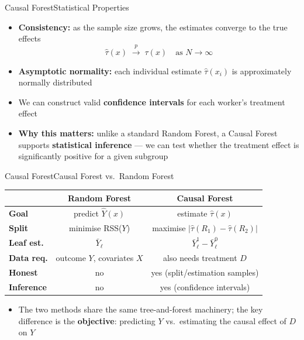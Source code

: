 \documentclass[dvipsnames,hyperref={pdfpagelabels=false}]{beamer}
\begin{document}
\begin{frame}{Causal Forest}{Statistical Properties}
\begin{itemize}
	\item \textbf{Consistency:} as the sample size grows, the estimates converge to the true effects
	\[
		\hat{\tau}(x) \;\xrightarrow{\;p\;}\; \tau(x) \quad \text{as } N \to \infty
	\]
	\vspace{0.1cm}
	\item \textbf{Asymptotic normality:} each individual estimate $\hat{\tau}(x_i)$ is approximately normally distributed
	\vspace{0.3cm}
	\item[$\Rightarrow$] We can construct valid \textbf{confidence intervals} for each worker's treatment effect
	\vspace{0.3cm}
	\item \textbf{Why this matters:} unlike a standard Random Forest, a Causal Forest supports \textbf{statistical inference} --- we can test whether the treatment effect is significantly positive for a given subgroup
\end{itemize}
\end{frame}




\begin{frame}{Causal Forest}{Causal Forest vs.\ Random Forest}
\begin{center}
\begin{tabular}{lcc}
	\hline
	& \textbf{Random Forest} & \textbf{Causal Forest} \\
	\hline
	\textbf{Goal}      & predict $\hat{Y}(x)$  & estimate $\hat{\tau}(x)$ \\[4pt]
	\textbf{Split}     & minimise RSS($Y$)     & maximise $|\hat{\tau}(R_1) - \hat{\tau}(R_2)|$ \\[4pt]
	\textbf{Leaf est.} & $\bar{Y}_\ell$        & $\bar{Y}^1_\ell - \bar{Y}^0_\ell$ \\[4pt]
	\textbf{Data req.} & outcome $Y$, covariates $X$ & also needs treatment $D$ \\[4pt]
	\textbf{Honest}    & no                    & yes (split/estimation samples) \\[4pt]
	\textbf{Inference} & no                    & yes (confidence intervals) \\
	\hline
\end{tabular}
\end{center}
\vspace{0.3cm}
\begin{itemize}
	\item The two methods share the same tree-and-forest machinery; the key difference is the \textbf{objective}: predicting $Y$ vs.\ estimating the causal effect of $D$ on $Y$
\end{itemize}
\end{frame}
\end{document}
